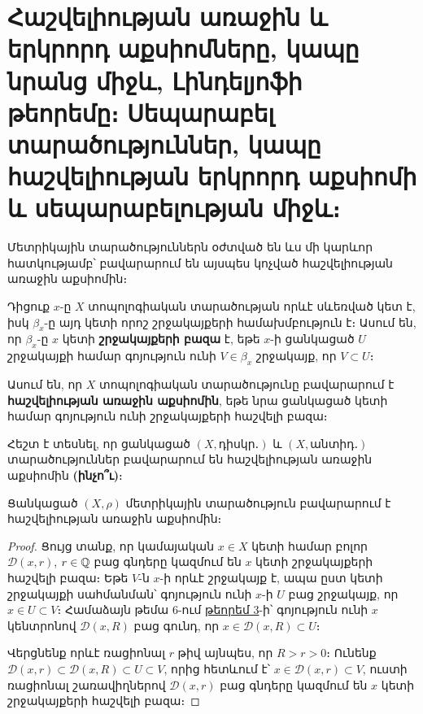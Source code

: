 \documentclass[./main.tex]{subfiles}
\begin{document}
\onehalfspacing
\section{Հաշվելիության առաջին և երկրորդ աքսիոմները, կապը նրանց միջև, Լինդելյոֆի թեորեմը։ Սեպարաբել տարածություններ, կապը հաշվելիության երկրորդ աքսիոմի և սեպարաբելության միջև։
}\label{sec:8}
 
\par Մետրիկային տարածություններն օժտված են ևս մի կարևոր հատկությամբ՝ բա\-վա\-րա\-րում են այսպես կոչված հաշվելիության առաջին աքսիոմին։

\begin{definition}
Դիցուք $x$-ը $X$ տոպոլոգիական տարածության որևէ սևեռված կետ է, իսկ $\beta_x$-ը այդ կետի որոշ շրջակայքերի համախմբություն է։ Ասում են, որ $\beta_x$-ը $x$ կետի \textbf{շրջակայքերի բազա} է, եթե $x$-ի ցանկացած $U$ շրջակայքի համար գոյություն ունի $V \in \beta_x$ շրջակայք, որ $V \subset U$։
\end{definition}

\begin{definition}
Ասում են, որ $X$ տոպոլոգիական տարածությունը բավարարում է \textbf{հաշվելիության առաջին աքսիոմին}, եթե նրա ցանկացած կետի համար գոյություն ունի շրջակայքերի հաշվելի բազա։
\end{definition}
\begin{example}\label{ch8ex1}
Հեշտ է տեսնել, որ ցանկացած $(X, \textrm{դիսկր․})$ և $(X, \textrm{անտիդ․})$ տարա\-ծու\-թյուն\-ներ բավարարում են հաշ\-վելիու\-թյան առաջին աքսիոմին \textbf{(ինչո՞ւ)}։
\end{example}


\begin{theorem}\label{ch8thm1}
\label{thm:8.1}
Ցանկացած $(X, \rho)$ մետրիկային տարածություն բավարարում է հաշ\-վե\-լի\-ու\-թյան առաջին աքսիոմին։
\end{theorem}
\begin{proof}
Ցույց տանք, որ կամայական $x \in X$ կետի համար բոլոր $\mathcal{D}(x,r)$, ${r \in \mathbb{Q}}$ բաց գնդերը կազմում են $x$ կետի շրջակայքերի հաշվելի բազա։ Եթե $V$-ն $x$-ի որևէ շրջակայք է, ապա ըստ կետի շրջակայքի սահմանման՝ գոյություն ունի $x$-ի $U$ բաց շրջակայք, որ $x \in U \subset V$։ Համաձայն թեմա 6-ում \hyperref[ch6thm3]{թեորեմ 3}-ի՝ գոյություն ունի $x$ կենտրոնով $\mathcal{D}(x,R)$ բաց գունդ, որ $x \in \mathcal{D}(x,R) \subset U$։
\par Վերցնենք որևէ ռացիոնալ $r$ թիվ այնպես, որ  $R>r>0$։ Ունենք $\mathcal{D}(x,r) \subset \mathcal{D}(x, R) \subset U \subset V$, որից հետևում է՝ $x \in \mathcal{D}(x,r) \subset V$, ուստի ռացիոնալ շառավիղ\-նե\-րով $\mathcal{D}(x,r)$ բաց գնդերը կազմում են $x$ կետի շրջակայքերի հաշվելի բազա։
\end{proof}
\end{document}
